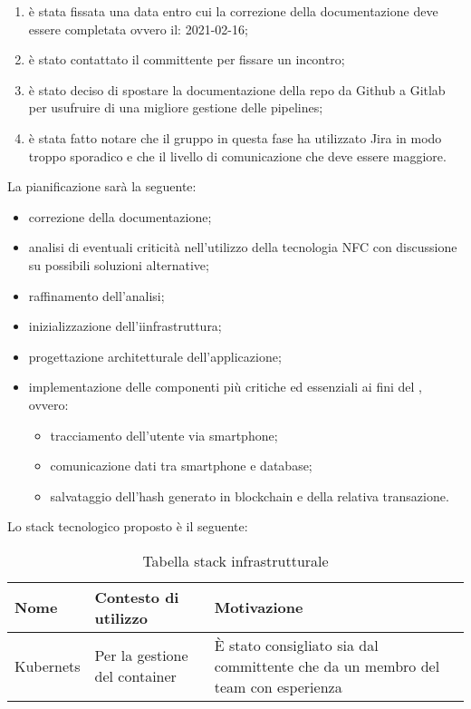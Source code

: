\begin{enumerate}
    \item è stata fissata una data entro cui la correzione della documentazione deve essere completata ovvero il: 2021-02-16;
    \item è stato contattato il committente per fissare un incontro;
    \item è stato deciso di spostare la documentazione della repo da Github a Gitlab per usufruire di una migliore gestione delle pipelines;
    \item è stata fatto notare che il gruppo in questa fase ha utilizzato Jira in modo troppo sporadico e che il livello di 
    comunicazione che deve essere maggiore.
\end{enumerate}

    La pianificazione sarà la seguente:
    \begin{itemize}
    \item correzione della documentazione;
    \item analisi di eventuali criticità nell'utilizzo della tecnologia NFC con discussione su possibili soluzioni alternative;
    \item raffinamento dell'analisi;
    \item inizializzazione dell'iinfrastruttura;
    \item progettazione architetturale dell'applicazione;
    \item implementazione delle componenti più critiche ed essenziali ai fini del , ovvero:
        \begin{itemize}
            \item tracciamento dell'utente via smartphone;
            \item comunicazione dati tra smartphone e database;
            \item salvataggio dell'hash generato in blockchain e della relativa transazione.
        \end{itemize}
    \end{itemize}
    Lo stack tecnologico proposto è il seguente:
	\renewcommand{\arraystretch}{2}
    \begin{longtable}{ C{5cm} C{4cm} C{5cm} }
        \caption{Tabella stack infrastrutturale}                                                                                 \\
        \rowcolor{\primaryColor}
        \textcolor{\secondaryColor}{\textbf{Nome}} & \textcolor{\secondaryColor}{\textbf{Contesto di utilizzo}} & \textcolor{\secondaryColor}{\textbf{Motivazione}}\\ \endhead
        {Kubernets} & {Per la gestione del container}   & {È stato consigliato sia dal committente che da un membro del team con esperienza}\\
    \end{longtable}

